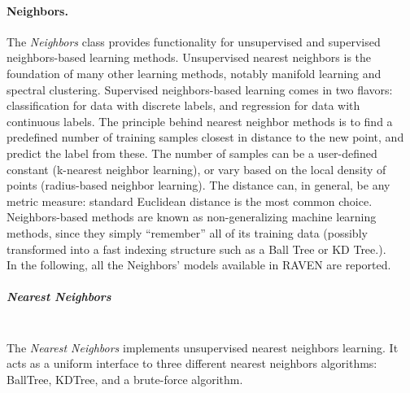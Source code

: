 \paragraph{Neighbors.}
\label{Neighbors}
The \textit{Neighbors} class provides functionality for unsupervised and
supervised neighbors-based learning methods.
%
Unsupervised nearest neighbors is the foundation of many other learning methods,
notably manifold learning and spectral clustering.
%
Supervised neighbors-based learning comes in two flavors: classification for
data with discrete labels, and regression for data with continuous labels.
%
The principle behind nearest neighbor methods is to find a predefined number of
training samples closest in distance to the new point, and predict the label
from these.
%
The number of samples can be a user-defined constant (k-nearest neighbor
learning), or vary based on the local density of points (radius-based neighbor
learning).
%
The distance can, in general, be any metric measure: standard Euclidean distance
is the most common choice.
%
Neighbors-based methods are known as non-generalizing machine learning methods,
since they simply “remember” all of its training data (possibly transformed
into a fast indexing structure such as a Ball Tree or KD Tree.).
%
\\In the following, all the Neighbors' models available in RAVEN are reported.
%
\subparagraph{Nearest Neighbors}
\mbox{}
\\The \textit{Nearest Neighbors} implements unsupervised nearest neighbors
learning.
%
It acts as a uniform interface to three different nearest neighbors algorithms:
BallTree, KDTree, and a brute-force algorithm.
%
